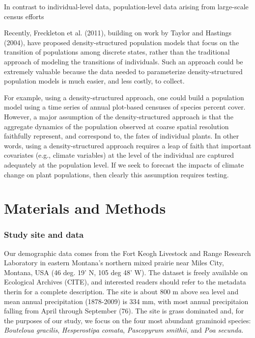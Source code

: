 \documentclass[author-year, 12pt,review]{components/elsarticle} %
\begin{document}
In contrast to individual-level data, population-level data arising from
large-scale census efforts

Recently, Freckleton et al. (2011), building on work by Taylor and
Hastings (2004), have proposed density-structured population models that
focus on the transition of populations among discrete states, rather
than the traditional approach of modeling the transitions of
individuals. Such an approach could be extremely valuable because the
data needed to parameterize density-structured population models is much
easier, and less costly, to collect.

For example, using a density-structured approach, one could build a
population model using a time series of annual plot-based censuses of
species percent cover. However, a major assumption of the
density-structured approach is that the aggregate dynamics of the
population observed at coarse spatial resolution faithfully represent,
and correspond to, the fates of individual plants. In other words, using
a density-structured approach requires a leap of faith that important
covariates (e.g., climate variables) at the level of the individual are
captured adequately at the population level. If we seek to forecast the
impacts of climate change on plant populations, then clearly this
assumption requires testing.

\section{Materials and Methods}\label{materials-and-methods}

\subsubsection{Study site and data}\label{study-site-and-data}

Our demographic data comes from the Fort Keogh Livestock and Range
Research Laboratory in eastern Montana's northern mixed prairie near
Miles City, Montana, USA (46 deg. 19' N, 105 deg 48' W). The dataset is
freely available on Ecological Archives (CITE), and interested readers
should refer to the metadata therin for a complete description. The site
is about 800 m above sea level and mean annual precipitation (1878-2009)
is 334 mm, with most annual precipitaion falling from April through
September (76). The site is grass dominated and, for the purposes of our
study, we focus on the four most abundant graminoid species:
\emph{Bouteloua gracilis}, \emph{Hesperostipa comata},
\emph{Pascopyrum smithii}, and \emph{Poa secunda}.
\end{document}
